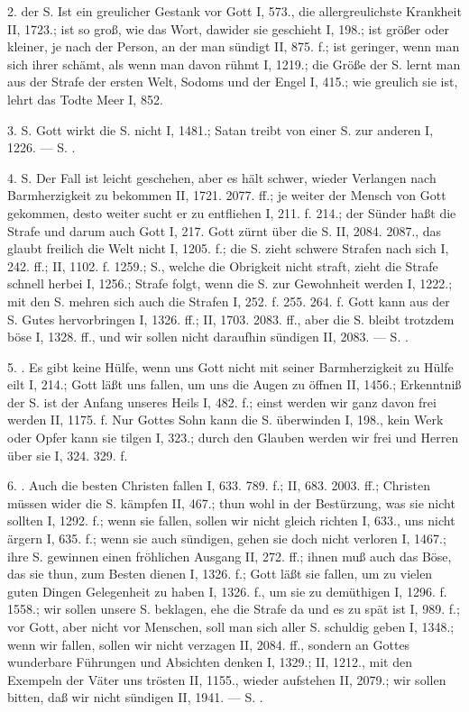 2.  der S. Ist ein greulicher Gestank vor Gott I, 573., die allergreulichste Krankheit II, 1723.; ist so groß, wie das Wort, dawider sie geschieht I, 198.; ist größer oder kleiner, je nach der Person, an der man sündigt II, 875. f.; ist geringer, wenn man sich ihrer schämt, als wenn man davon rühmt I, 1219.; die Größe der S. lernt man aus der Strafe der ersten Welt, Sodoms und der Engel I, 415.; wie greulich sie ist, lehrt das Todte Meer I, 852.

3.  S. Gott wirkt die S. nicht I, 1481.; Satan treibt von einer S. zur anderen I, 1226. — S. .

4.  S. Der Fall ist leicht geschehen, aber es hält schwer, wieder Verlangen nach Barmherzigkeit zu bekommen II, 1721. 2077. ff.; je weiter der Mensch von Gott gekommen, desto weiter sucht er zu entfliehen I, 211. f. 214.; der Sünder haßt die Strafe und darum auch Gott I, 217. Gott zürnt über die S. II, 2084. 2087., das glaubt freilich die Welt nicht I, 1205. f.; die S. zieht schwere Strafen nach sich I, 242. ff.; II, 1102. f. 1259.; S., welche die Obrigkeit nicht straft, zieht die Strafe schnell herbei I, 1256.; Strafe folgt, wenn die S. zur Gewohnheit werden I, 1222.; mit den S. mehren sich auch die Strafen I, 252. f. 255. 264. f. Gott kann aus der S. Gutes hervorbringen I, 1326. ff.; II, 1703. 2083. ff., aber die S. bleibt trotzdem böse I, 1328. ff., und wir sollen nicht daraufhin sündigen II, 2083. — S. .

5. . Es gibt keine Hülfe, wenn uns Gott nicht mit seiner Barmherzigkeit zu Hülfe eilt I, 214.; Gott läßt uns fallen, um uns die Augen zu öffnen II, 1456.; Erkenntniß der S. ist der Anfang unseres Heils I, 482. f.; einst werden wir ganz davon frei werden II, 1175. f. Nur Gottes Sohn kann die S. überwinden I, 198., kein Werk oder Opfer kann sie tilgen I, 323.; durch den Glauben werden wir frei und Herren über sie I, 324. 329. f.

6. . Auch die besten Christen fallen I, 633. 789. f.; II, 683. 2003. ff.; Christen müssen wider die S. kämpfen II, 467.; thun wohl in der Bestürzung, was sie nicht sollten I, 1292. f.; wenn sie fallen, sollen wir nicht gleich richten I, 633., uns nicht ärgern I, 635. f.; wenn sie auch sündigen, gehen sie doch nicht verloren I, 1467.; ihre S. gewinnen einen fröhlichen Ausgang II, 272. ff.; ihnen muß auch das Böse, das sie thun, zum Besten dienen I, 1326. f.; Gott läßt sie fallen, um zu vielen guten Dingen Gelegenheit zu haben I, 1326. f., um sie zu demüthigen I, 1296. f. 1558.; wir sollen unsere S. beklagen, ehe die Strafe da und es zu spät ist I, 989. f.; vor Gott, aber nicht vor Menschen, soll man sich aller S. schuldig geben I, 1348.; wenn wir fallen, sollen wir nicht verzagen II, 2084. ff., sondern an Gottes wunderbare Führungen und Absichten denken I, 1329.; II, 1212., mit den Exempeln der Väter uns trösten II, 1155., wieder aufstehen II, 2079.; wir sollen bitten, daß wir nicht sündigen II, 1941. — S. .

